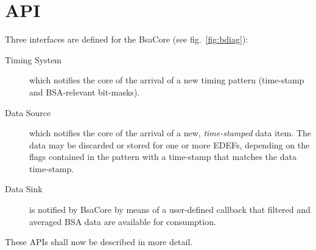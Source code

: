 \documentclass[11pt]{article}
\newcommand{\bsac}{BsaCore}
\newcommand{\bsa} {BSA}
\newcommand{\EDEF}{EDEF}
\begin{document}
\section{API}
Three interfaces are defined for the \bsac{} (see fig.~\ref{fig:bdiag}):
\begin{description}
\item[Timing System] which notifies the core of the arrival of a new timing pattern (time-stamp and
     \bsa{}-relevant bit-masks).
\item[Data Source] which notifies the core of the arrival of a new, {\em time-stamped} data item.
     The data may be discarded or stored for one or more \EDEF{}s, depending on the flags contained
     in the pattern with a time-stamp that matches the data time-stamp.
\item[Data Sink] is notified by \bsac{} by means of a user-defined callback that filtered and averaged
     \bsa{} data are available for consumption.
\end{description}
These APIs shall now be described in more detail.
\end{document}
